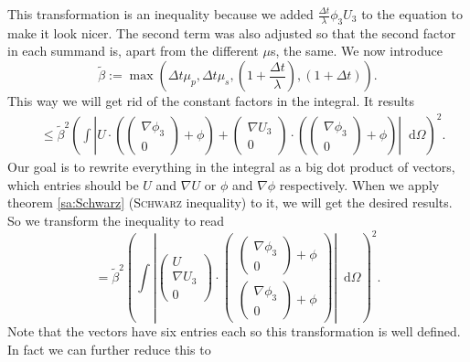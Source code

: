 \documentclass[12pt,a4paper,twoside, open=right]{scrreprt}
\theoremstyle{definition}
\theoremstyle{plain}
\newcommand{\abs}[1]{\left\vert #1\right\vert}
\newcommand{\D}{\mathop{}\!\mathrm{d}}
\begin{document}
This transformation is an inequality because we added $\frac{\Delta t}{\lambda}\phi_3U_3$ to the equation to make it look nicer. The second term was also adjusted so that the second factor in each summand is, apart from the different $\mu$s, the same. We now introduce 
\begin{equation}
    \tilde\beta:=\max\left(\Delta t\mu_p,\Delta t\mu_s,\left(1+\frac{\Delta t}{\lambda}\right), (1+\Delta t)\right).
\end{equation}
This way we will get rid of the constant factors in the integral. It results
\begin{align}
&\le \tilde\beta^2\left(\int \abs{U\cdot\left(\begin{pmatrix}
\nabla\phi_3\\0
\end{pmatrix}+\phi\right)+\begin{pmatrix}
\nabla U_3\\0
\end{pmatrix}\cdot\left(\begin{pmatrix}
\nabla\phi_3\\0
\end{pmatrix}+\phi\right)}\D\Omega\right)^2.
\end{align}
Our goal is to rewrite everything in the integral as a big dot product of vectors, which entries should be $U$ and $\nabla U$ or $\phi$ and $\nabla \phi$ respectively. When we apply theorem \ref{sa:Schwarz} (\textsc{Schwarz} inequality) to it, we will get the desired results. So we transform the inequality to read
\begin{equation}
    = \tilde\beta^2\left(\int\abs{\begin{pmatrix}
        U\\ \nabla U_3\\0
        \end{pmatrix}\cdot\begin{pmatrix}
        \begin{pmatrix}
        \nabla\phi_3\\0\end{pmatrix}+\phi
        \\\begin{pmatrix}
        \nabla\phi_3\\0\end{pmatrix}+\phi
        \end{pmatrix}}\D\Omega\right)^2.
\end{equation}
Note that the vectors have six entries each so this transformation is well defined. In fact we can further reduce this to
\end{document}
